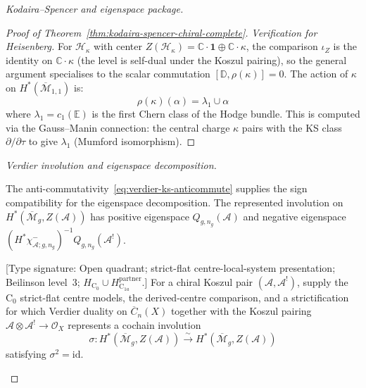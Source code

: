 \begin{proof}[Kodaira--Spencer and eigenspace package]
\begin{proof}[Proof of Theorem~\ref{thm:kodaira-spencer-chiral-complete}]
\emph{Verification for Heisenberg.} For $\mathcal{H}_\kappa$ with center
$Z(\mathcal{H}_\kappa) = \mathbb{C} \cdot \mathbf{1} \oplus \mathbb{C} \cdot \kappa$,
the comparison $\iota_Z$ is the identity on $\mathbb{C} \cdot \kappa$ (the level is
self-dual under the Koszul pairing), so the general argument specialises to the
scalar commutation $[\mathbb{D}, \rho(\kappa)] = 0$. The action of $\kappa$ on
$H^*(\overline{\mathcal{M}}_{1,1})$ is:
\begin{equation}
\rho(\kappa)(\alpha) = \lambda_1 \cup \alpha
\end{equation}
where $\lambda_1 = c_1(\mathbb{E})$ is the first Chern class of the Hodge bundle.
This is computed via the Gauss--Manin connection: the central charge $\kappa$ pairs with
the KS class $\partial/\partial\tau$ to give $\lambda_1$ (Mumford isomorphism).
\end{proof}

\emph{Verdier involution and eigenspace decomposition.}

The anti-commutativity~\eqref{eq:verdier-ks-anticommute} supplies the
sign compatibility for the eigenspace decomposition.  The represented
involution on $H^*(\overline{\mathcal{M}}_g,Z(\mathcal A))$ has positive
eigenspace $Q_{g,n_g}(\mathcal A)$ and negative eigenspace
$(H^*\chi^-_{\mathcal A;g,n_g})^{-1}Q_{g,n_g}(\mathcal A^!)$.

\begin{lemma}
\label{lem:verdier-involution-moduli}
\textup{[Type signature: Open quadrant; strict-flat
centre-local-system presentation; Beilinson level~3;
\(H_{\mathrm C_0}\cup H_{\mathrm C_{1a}}^{\mathrm{partner}}\).]}
For a chiral Koszul pair $(\mathcal{A}, \mathcal{A}^!)$, supply the
$\mathrm C_0$ strict-flat centre models, the derived-centre comparison,
and a strictification for which Verdier duality on
$\overline C_n(X)$ together with the Koszul pairing
$\mathcal A\otimes\mathcal A^!\to\mathcal O_X$ represents a cochain
involution
\begin{equation}
\sigma: H^*(\overline{\mathcal{M}}_g, Z(\mathcal{A})) \xrightarrow{\sim}
H^*(\overline{\mathcal{M}}_g, Z(\mathcal{A}))
\end{equation}
satisfying $\sigma^2 = \mathrm{id}$.
\end{lemma}


\end{proof}
